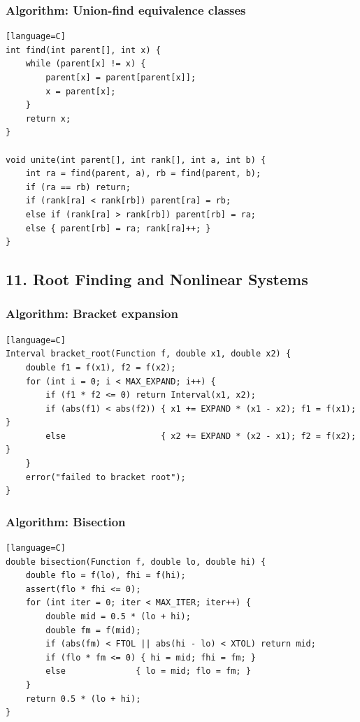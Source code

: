 \documentclass[11pt]{article}
\begin{document}
\subsubsection{Algorithm: Union-find equivalence classes}\label{algorithm-union-find-equivalence-classes}

\begin{verbatim}[language=C]
int find(int parent[], int x) {
    while (parent[x] != x) {
        parent[x] = parent[parent[x]];
        x = parent[x];
    }
    return x;
}

void unite(int parent[], int rank[], int a, int b) {
    int ra = find(parent, a), rb = find(parent, b);
    if (ra == rb) return;
    if (rank[ra] < rank[rb]) parent[ra] = rb;
    else if (rank[ra] > rank[rb]) parent[rb] = ra;
    else { parent[rb] = ra; rank[ra]++; }
}
\end{verbatim}

\subsection{11. Root Finding and Nonlinear Systems}\label{root-finding-and-nonlinear-systems}

\subsubsection{Algorithm: Bracket expansion}\label{algorithm-bracket-expansion}

\begin{verbatim}[language=C]
Interval bracket_root(Function f, double x1, double x2) {
    double f1 = f(x1), f2 = f(x2);
    for (int i = 0; i < MAX_EXPAND; i++) {
        if (f1 * f2 <= 0) return Interval(x1, x2);
        if (abs(f1) < abs(f2)) { x1 += EXPAND * (x1 - x2); f1 = f(x1); }
        else                   { x2 += EXPAND * (x2 - x1); f2 = f(x2); }
    }
    error("failed to bracket root");
}
\end{verbatim}

\subsubsection{Algorithm: Bisection}\label{algorithm-bisection}

\begin{verbatim}[language=C]
double bisection(Function f, double lo, double hi) {
    double flo = f(lo), fhi = f(hi);
    assert(flo * fhi <= 0);
    for (int iter = 0; iter < MAX_ITER; iter++) {
        double mid = 0.5 * (lo + hi);
        double fm = f(mid);
        if (abs(fm) < FTOL || abs(hi - lo) < XTOL) return mid;
        if (flo * fm <= 0) { hi = mid; fhi = fm; }
        else              { lo = mid; flo = fm; }
    }
    return 0.5 * (lo + hi);
}
\end{verbatim}
\end{document}
